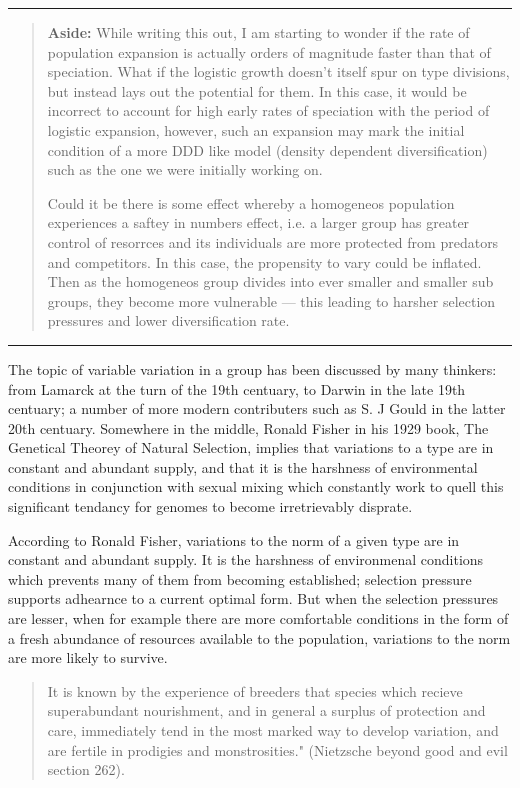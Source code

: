 \vspace{10pt}
\hrule
\vspace{10pt}
\noindent
\begin{quotation}
\noindent
\textbf{Aside:} While writing this out, I am starting to wonder if the rate of population expansion is actually orders of magnitude faster than that of speciation. What if the logistic growth doesn't itself spur on type divisions, but instead lays out the potential for them. In this case, it would be incorrect to account for high early rates of speciation with the period of logistic expansion, however, such an expansion may mark the initial condition of a more DDD like model (density dependent diversification) such as the one we were initially working on.  \par

Could it be there is some effect whereby a homogeneos population experiences a saftey in numbers effect, i.e. a larger group has greater control of resorrces and its individuals are more protected from predators and competitors. In this case, the propensity to vary could be inflated. Then as the homogeneos group divides into ever smaller and smaller sub groups, they become more vulnerable --- this leading to harsher selection pressures and lower diversification rate.  
\end{quotation}
\vspace{10pt}
\hrule  
\vspace{10pt}

\noindent
The topic of variable variation in a group has been discussed by many thinkers: from Lamarck at the turn of the 19th centuary, to Darwin in the late 19th centuary; a number of more modern contributers such as S. J Gould in the latter 20th centuary. 
Somewhere in the middle, Ronald Fisher in his 1929 book, The Genetical Theorey of Natural Selection, implies that variations to a type are in constant and abundant supply, and that it is the harshness of environmental conditions in conjunction with sexual mixing which constantly work to quell this significant tendancy for genomes to become irretrievably disprate. 




According to Ronald Fisher, variations to the norm of a given type are in constant and abundant supply. It is the harshness of environmenal conditions which prevents many of them from becoming established; selection pressure supports adhearnce to a current optimal form. But when the selection pressures are lesser, when for example there are more comfortable conditions in the form of a fresh abundance of resources available to the population, variations to the norm are more likely to survive. 
\begin{quotation}
It is known by the experience of breeders that species which recieve superabundant nourishment, and in general a surplus of protection and care, immediately tend in the most marked way to develop variation, and are fertile in prodigies and monstrosities." (Nietzsche beyond good and evil section 262).
\end{quotation}

